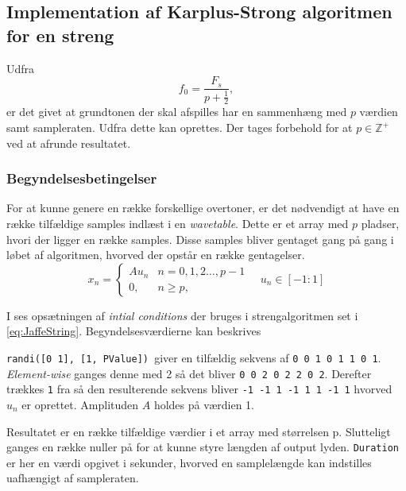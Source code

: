 \subsection{Implementation af Karplus-Strong algoritmen for en streng}
Udfra
\begin{equation}
  f_0 = \frac{F_s}{p + \frac{1}{2}},
\end{equation} er det givet at grundtonen der skal afspilles har en sammenhæng med $p$ værdien samt sampleraten\cite{Karplus1983}. Udfra dette kan  oprettes.
Der tages forbehold for at $p \in \mathbb{Z^+}$ ved at afrunde resultatet.

\subsubsection{Begyndelsesbetingelser}
For at kunne genere en række forskellige overtoner, er det nødvendigt at have en række tilfældige samples indlæst i en \emph{wavetable}. Dette er et array med $p$ pladser, hvori der ligger en række samples. Disse samples bliver gentaget gang på gang i løbet af algoritmen, hvorved der opstår en række gentagelser.
\begin{equation}
  x_{n} =
  \begin{cases}
    A u_n & n = 0,1,2 \dots , p - 1 \\
    0,    & n \geq p,
  \end{cases}
  \quad u_n \in [-1:1]
\end{equation}


I  ses opsætningen af \emph{intial conditions} der bruges i strengalgoritmen set i \eqref{eq:JaffeString}. Begyndelsesværdierne kan beskrives \cite{Jaffe1983}


\texttt{randi([0 1], [1, PValue]) }giver en tilfældig sekvens af \texttt{0 0 1 0 1 1 0 1}. \emph{Element-wise} ganges denne med 2 så det bliver \texttt{0 0 2 0 2 2 0 2}. Derefter trækkes \texttt{1} fra så den resulterende sekvens bliver \texttt{-1 -1 1 -1 1 1 -1 1} hvorved $u_n$ er oprettet. Amplituden $A$ holdes på værdien 1.

Resultatet er en række tilfældige værdier i et array med størrelsen p. Slutteligt ganges en række nuller på for at kunne styre længden af output lyden. \texttt{Duration} er her en værdi opgivet i sekunder, hvorved en samplelængde kan indstilles uafhængigt af sampleraten.
